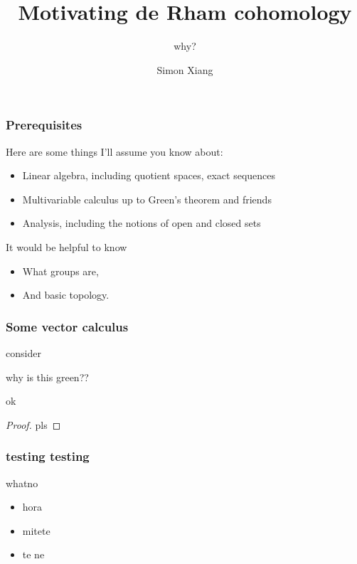 \documentclass[xcolor=dvipsnames]{beamer}
\title{Motivating de Rham cohomology}
\subtitle{why?}
\author{Simon Xiang}
\institute{University of Texas at Austin}
\begin{document}
 
    \begin{frame}
        \titlepage
    \end{frame}

    \begin{frame}
        \frametitle{Prerequisites} 
        Here are some things I'll assume you know about:\pause
        \begin{itemize}
            \item Linear algebra, including quotient spaces, exact sequences\pause
            \item Multivariable calculus up to Green's theorem and friends\pause
            \item Analysis, including the notions of open and closed sets\pause
        \end{itemize}
        It would be helpful to know
        \begin{itemize}
            \item What groups are,\pause
            \item And basic topology.
        \end{itemize}
    \end{frame}
    \begin{frame}
        \frametitle{Some vector calculus} 
        \begin{example}
            consider
        \end{example}\pause
        \small{why is this green??} \pause
        \begin{theorem}
            ok
        \end{theorem}\pause
        \begin{proof}
            pls
        \end{proof}
    \end{frame}
    

    \begin{frame}
        \frametitle{testing testing} 
        \begin{definition}
            what\alert{no} 
        \end{definition}
        \begin{itemize}
            \item<1-> hora
            \item<2-> mitete
            \item<3->te ne
            \end{itemize} 
    \end{frame}
\end{document}
